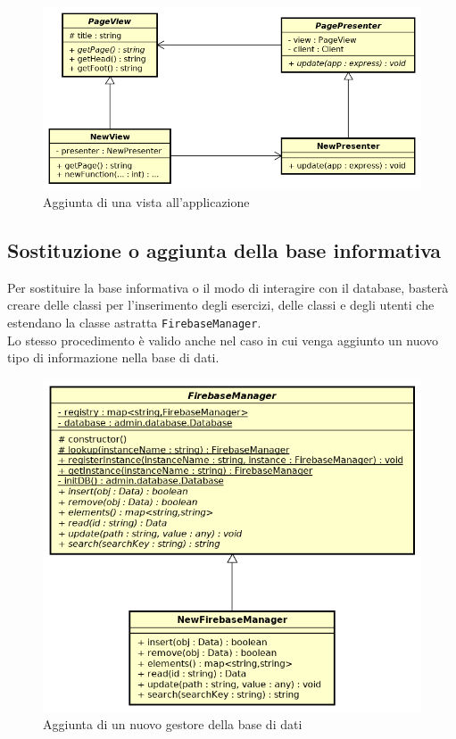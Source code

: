 \begin{figure}[ht]
	\includegraphics[scale=0.75]{images/newview.png}
	\caption{Aggiunta di una vista all'applicazione}
\end{figure}
\newpage

\subsection{Sostituzione o aggiunta della base informativa}
Per sostituire la base informativa o il modo di interagire con il database, basterà creare delle classi per l'inserimento degli esercizi, delle classi e degli utenti che estendano la classe astratta \texttt{FirebaseManager}.\\
Lo stesso procedimento è valido anche nel caso in cui venga aggiunto un nuovo tipo di informazione nella base di dati.\\
\vspace*{3em}

\begin{figure}[ht]
	\centering
	\includegraphics[scale=0.75]{images/newfirebasemanager.png}
	\caption{Aggiunta di un nuovo gestore della base di dati}
\end{figure}